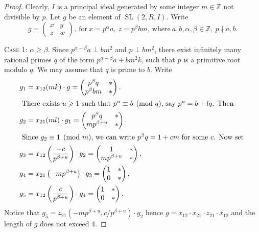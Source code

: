 \documentclass[11pt]{amsart}
\theoremstyle{plain}
\numberwithin{equation}{section}
\numberwithin{lemma}{section}
\theoremstyle{definition}
\theoremstyle{remark}
\DeclareMathOperator{\SL}{SL}
\begin{document}
\begin{proof}
Clearly, $I$ is a principal ideal generated by some integer $m\in\mathbb{Z}$ not divisible by $p$.
Let $g$ be an element of $\SL(2,R,I)$. Write
\[ g=\begin{pmatrix}x & y \\ z & w\end{pmatrix},\ \text{for}\ x=p^\alpha a,\ z=p^\beta bm,\ \text{where}\ a,b,\alpha,\beta\in\mathbb{Z},\ p\nmid a,b. \]

\textsc{Case 1:} $\alpha\geqslant\beta$. 
Since $p^{\alpha-\beta}a\perp bm^2$ and $p\perp bm^2$, there exist infinitely many rational primes $q$ of the form $p^{\alpha-\beta}a+bm^2k$,
such that $p$ is a primitive root modulo $q$. 
We may assume that $q$ is prime to $b$. 
Write
\begin{align*}
g_1 & = x_{12}(mk)\cdot g =
\begin{pmatrix} p^\beta q & * \\ p^\beta bm & * \end{pmatrix}. \\
\intertext{
There exists $u\geqslant 1$ such that $p^u\equiv b\pmod q$, say $p^u=b+lq$. Then
}
g_2 & = x_{21}(ml)\cdot g_1 =
\begin{pmatrix} p^\beta q & * \\ mp^{\beta+u} & * \end{pmatrix}. \\
\intertext{
Since $g_2\equiv 1\pmod m$, we can write $p^\beta q=1+cm$ for some $c$. Now set
}
g_3 & = x_{12}\left(\dfrac{-c}{p^{\beta+u}}\right)\cdot g_2 =
\begin{pmatrix} 1 & * \\ mp^{\beta+u} & * \end{pmatrix}, \\
g_4 & = x_{21}\left(-mp^{\beta+u}\right)\cdot g_3 =
\begin{pmatrix} 1 & * \\ 0 & * \end{pmatrix}, \\
g_5 & = x_{12}\left(\dfrac{c}{p^{\beta+u}}\right)\cdot g_4 =
\begin{pmatrix} 1 & * \\ 0 & * \end{pmatrix}.
\end{align*}
Notice that $g_5=z_{21}\left(-mp^{\beta+u}, c/p^{\beta+u}\right)\cdot g_2$ hence $g=x_{12} \cdot x_{21} \cdot z_{21} \cdot x_{12}$
and the length of $g$ does not exceed $4$.


\end{proof}
\end{document}
